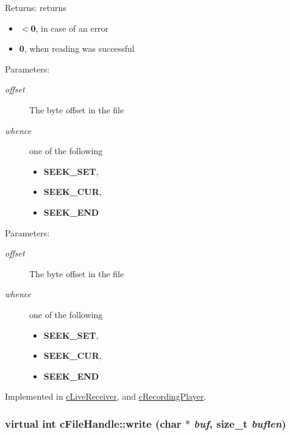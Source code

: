 \begin{Desc}
\item[Returns:]returns\begin{itemize}
\item {\bf $<$0}, in case of an error\item {\bf 0}, when reading was successful\end{itemize}
\end{Desc}
\begin{Desc}
\item[Parameters:]
\begin{description}
\item[{\em offset}]The byte offset in the file \item[{\em whence}]one of the following\begin{itemize}
\item {\bf SEEK\_\-SET},\item {\bf SEEK\_\-CUR},\item {\bf SEEK\_\-END} \end{itemize}
\end{description}
\end{Desc}
\begin{Desc}
\item[Parameters:]
\begin{description}
\item[{\em offset}]The byte offset in the file \item[{\em whence}]one of the following\begin{itemize}
\item {\bf SEEK\_\-SET},\item {\bf SEEK\_\-CUR},\item {\bf SEEK\_\-END} \end{itemize}
\end{description}
\end{Desc}


Implemented in \hyperlink{classcLiveReceiver_efb4156ef247773873dee42053e94edf}{cLiveReceiver}, and \hyperlink{classcRecordingPlayer_43f7ba867374d6be9e78c68c872bf608}{cRecordingPlayer}.\hypertarget{classcFileHandle_e1495303f52f6f2d7ac37a030f78a937}{
\subsubsection[{write}]{\setlength{\rightskip}{0pt plus 5cm}virtual int cFileHandle::write (char $\ast$ {\em buf}, \/  size\_\-t {\em buflen})}}
\label{classcFileHandle_e1495303f52f6f2d7ac37a030f78a937}


